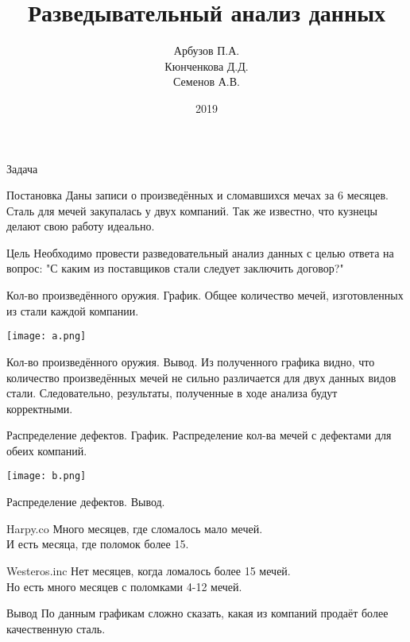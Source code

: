 \documentclass{beamer}
\begin{document}
	\title{Разведывательный анализ данных}
	\author{Арбузов П.А. \\ Кюнченкова Д.Д. \\ Семенов А.В.}
	\date{2019}
	
	\frame{\titlepage}
	
	\begin{frame}{Задача}
		\begin{block}{Постановка}
			Даны записи о произведённых и сломавшихся мечах за 6 месяцев. Сталь для мечей закупалась у двух компаний. Так же известно, что кузнецы делают свою работу идеально.
		\end{block}
		\begin{block}{Цель}
			Необходимо провести разведовательный анализ данных с целью ответа на вопрос: "С каким из поставщиков стали следует заключить договор?"
		\end{block}
	\end{frame}

	\begin{frame}{Кол-во произведённого оружия. График.}
		Общее количество мечей, изготовленных из стали каждой компании.
		\begin{center}
			\texttt{[image: a.png]}
		\end{center}
	\end{frame}	

	\begin{frame}{Кол-во произведённого оружия. Вывод.}
		Из полученного графика видно, что количество произведённых мечей не сильно различается для двух данных видов стали.
		Следовательно, результаты, полученные в ходе анализа будут корректными.
	\end{frame}
	
	\begin{frame}{Распределение дефектов. График.}
		Распределение кол-ва мечей с дефектами для обеих компаний.
		\begin{center}
			\texttt{[image: b.png]}
		\end{center}
	\end{frame}		
	
	\begin{frame}{Распределение дефектов. Вывод.}
		\begin{block}{Harpy.co}
			Много месяцев, где сломалось мало мечей. \\
			И есть месяца, где поломок более 15.
		\end{block}
		\begin{block}{Westeros.inc}
			Нет месяцев, когда ломалось более 15 мечей. \\
			Но есть много месяцев с поломками 4-12 мечей.
		\end{block}
		\begin{block}{Вывод}
			По данным графикам сложно сказать, какая из компаний продаёт более качественную сталь.
		\end{block}
	\end{frame}
\end{document}
